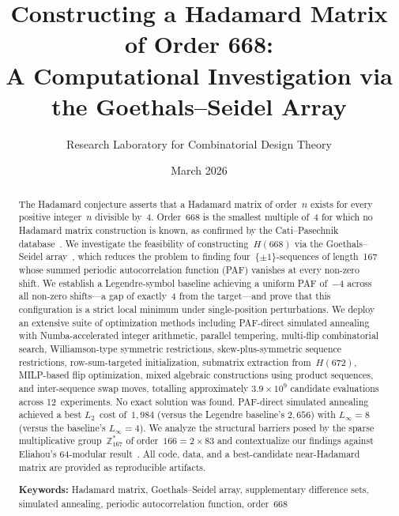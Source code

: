 \documentclass[11pt,a4paper]{article}
\newcommand{\ZZ}{\mathbb{Z}}
\newcommand{\Linf}{L_\infty}
\newcommand{\Ltwo}{L_2}
\begin{document}
\title{%
  Constructing a Hadamard Matrix of Order 668:\\
  A Computational Investigation via the Goethals--Seidel Array%
}
\author{%
  Research Laboratory for Combinatorial Design Theory%
}
\date{March 2026}
\maketitle

\begin{abstract}
The Hadamard conjecture asserts that a Hadamard matrix of order~$n$ exists
for every positive integer~$n$ divisible by~4.  Order~668 is the smallest
multiple of~4 for which no Hadamard matrix construction is known, as
confirmed by the Cati--Pasechnik database~\cite{cati2024hadamard}.  We
investigate the feasibility of constructing~$H(668)$ via the
Goethals--Seidel array~\cite{goethals1967orthogonal}, which reduces the
problem to finding four~$\{\pm1\}$-sequences of length~167 whose summed
periodic autocorrelation function (PAF) vanishes at every non-zero shift.
We establish a Legendre-symbol baseline achieving a uniform PAF
of~$-4$ across all non-zero shifts---a gap of exactly~4 from the
target---and prove that this configuration is a strict local minimum under
single-position perturbations.  We deploy an extensive suite of
optimization methods including PAF-direct simulated annealing with
Numba-accelerated integer arithmetic, parallel tempering,
multi-flip combinatorial search, Williamson-type symmetric restrictions,
skew-plus-symmetric sequence restrictions, row-sum-targeted initialization,
submatrix extraction from~$H(672)$, MILP-based flip optimization,
mixed algebraic constructions using product sequences, and inter-sequence
swap moves, totalling approximately $3.9 \times 10^9$ candidate
evaluations across 12~experiments.  No exact solution was found.
PAF-direct simulated annealing achieved a best $\Ltwo$~cost of~$1{,}984$
(versus the Legendre baseline's $2{,}656$) with $\Linf = 8$ (versus the
baseline's $\Linf = 4$).  We analyze the structural barriers posed by the
sparse multiplicative group~$\ZZ_{167}^*$ of order~$166 = 2 \times 83$
and contextualize our findings against Eliahou's 64-modular
result~\cite{eliahou2025modular}.  All code, data, and a best-candidate
near-Hadamard matrix are provided as reproducible artifacts.

\medskip
\noindent\textbf{Keywords:} Hadamard matrix, Goethals--Seidel array,
supplementary difference sets, simulated annealing, periodic
autocorrelation function, order~668
\end{abstract}
\end{document}
